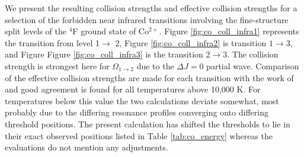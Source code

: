 We present the resulting collision strengths and effective collision strengths for a selection of the forbidden near infrared transitions involving the fine-structure split levels of the $^4$F ground state of Co$^{2+}$. Figure \ref{fig:co_coll_infra1} represents the transition from level 1$\rightarrow$ 2, Figure \ref{fig:co_coll_infra2} is transition $1 \rightarrow 3$, and Figure Figure \ref{fig:co_coll_infra3} is the transition $2 \rightarrow 3$. The collision strength is strongest here for $\Omega_{1 \rightarrow 2}$ due to the $\Delta J = 0$ partial wave. Comparison of the effective collision strengths are made for each transition with the work of \citet{2016MNRAS.tmp..556S} and good agreement is found for all temperatures above 10,000 K. For temperatures below this value the two calculations deviate somewhat, most probably due to the differing resonance profiles converging onto differing threshold positions. The present calculation has shifted the thresholds to lie in their exact observed positions listed in Table \ref{tab:co_energy} whereas the \citet{2016MNRAS.tmp..556S} evaluations do not mention any adjustments.

